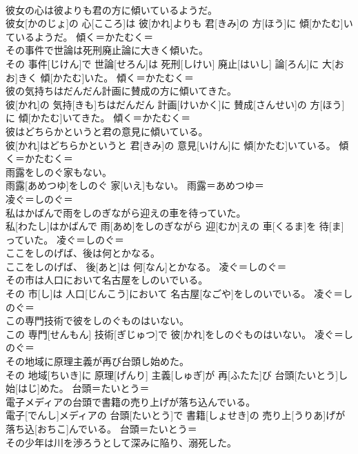 \documentclass[8pt]{extreport}
\begin{document}
\begin{CJK}{UTF8}{min}
\\	彼女の心は彼よりも君の方に傾いているようだ。	
\\	彼女[かのじょ]の 心[こころ]は 彼[かれ]よりも 君[きみ]の 方[ほう]に 傾[かたむ]いているようだ。	傾く＝かたむく＝ 
\\	その事件で世論は死刑廃止論に大きく傾いた。	
\\	その 事件[じけん]で 世論[せろん]は 死刑[しけい] 廃止[はいし] 論[ろん]に 大[おお]きく 傾[かたむ]いた。	傾く＝かたむく＝ 
\\	彼の気持ちはだんだん計画に賛成の方に傾いてきた。	
\\	彼[かれ]の 気持[きも]ちはだんだん 計画[けいかく]に 賛成[さんせい]の 方[ほう]に 傾[かたむ]いてきた。	傾く＝かたむく＝ 
\\	彼はどちらかというと君の意見に傾いている。	
\\	彼[かれ]はどちらかというと 君[きみ]の 意見[いけん]に 傾[かたむ]いている。	傾く＝かたむく＝ 
\\	雨露をしのぐ家もない。	
\\	雨露[あめつゆ]をしのぐ 家[いえ]もない。	雨露＝あめつゆ＝ 
\\	凌ぐ＝しのぐ＝ 
\\	私はかばんで雨をしのぎながら迎えの車を待っていた。	
\\	私[わたし]はかばんで 雨[あめ]をしのぎながら 迎[むか]えの 車[くるま]を 待[ま]っていた。	凌ぐ＝しのぐ＝ 
\\	ここをしのげば、後は何とかなる。	
\\	ここをしのげば、 後[あと]は 何[なん]とかなる。	凌ぐ＝しのぐ＝ 
\\	その市は人口において名古屋をしのいでいる。	
\\	その 市[し]は 人口[じんこう]において 名古屋[なごや]をしのいでいる。	凌ぐ＝しのぐ＝ 
\\	この専門技術で彼をしのぐものはいない。	
\\	この 専門[せんもん] 技術[ぎじゅつ]で 彼[かれ]をしのぐものはいない。	凌ぐ＝しのぐ＝ 
\\	その地域に原理主義が再び台頭し始めた。	
\\	その 地域[ちいき]に 原理[げんり] 主義[しゅぎ]が 再[ふたた]び 台頭[たいとう]し 始[はじ]めた。	台頭＝たいとう＝ 
\\	電子メディアの台頭で書籍の売り上げが落ち込んでいる。	
\\	電子[でんし]メディアの 台頭[たいとう]で 書籍[しょせき]の 売り上[うりあ]げが 落ち込[おちこ]んでいる。	台頭＝たいとう＝ 
\\	その少年は川を渉ろうとして深みに陥り、溺死した。	

\end{CJK}
\end{document}
